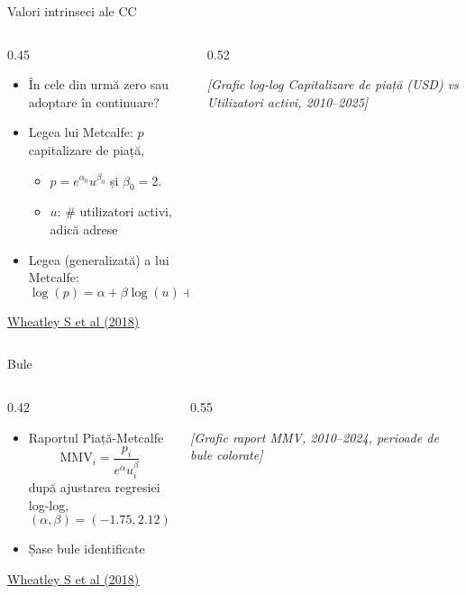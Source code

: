 \documentclass[9pt, aspectratio=169, t]{beamer}
\theoremstyle{definition}
\begin{document}
\begin{frame}{Valori intrinseci ale CC}
\begin{columns}[T]
\begin{column}{0.45\textwidth}
\begin{itemize}
    \item În cele din urmă zero sau adoptare în continuare?
    \item Legea lui Metcalfe: $p$ capitalizare de piață,
    \begin{itemize}
        \item $p = e^{\alpha_0} u^{\beta_0}$ și $\beta_0 = 2$.
        \item $u$: \# utilizatori activi, adică adrese
    \end{itemize}
    \item Legea (generalizată) a lui Metcalfe:
    \[
    \log(p) = \alpha + \beta \log(u) + \varepsilon
    \]
\end{itemize}

\vspace{0.5cm}

{\small \href{https://doi.org/10.1016/j.econlet.2018.09.007}{\underline{Wheatley S et al (2018)}}}
\end{column}
\begin{column}{0.52\textwidth}
\begin{center}
    {\small\textit{[Grafic log-log Capitalizare de piață (USD) vs Utilizatori activi, 2010--2025]}}

    \vspace{1cm}

\end{center}
\end{column}
\end{columns}
\end{frame}

\begin{frame}{Bule}
\begin{columns}[T]
\begin{column}{0.42\textwidth}
\begin{itemize}
    \item Raportul Piață-Metcalfe
    \[
    \text{MMV}_i = \frac{p_i}{e^{\alpha} u_i^{\beta}}
    \]
    după ajustarea regresiei log-log,
    \[
    (\alpha, \beta) = (-1.75, 2.12)
    \]
    \item Șase bule identificate
\end{itemize}

\vspace{0.5cm}

{\small \href{https://doi.org/10.1016/j.econlet.2018.09.007}{\underline{Wheatley S et al (2018)}}}
\end{column}
\begin{column}{0.55\textwidth}
\begin{center}
    {\small\textit{[Grafic raport MMV, 2010--2024, perioade de bule colorate]}}

    \vspace{1cm}

\end{center}
\end{column}
\end{columns}
\end{frame}
\end{document}
